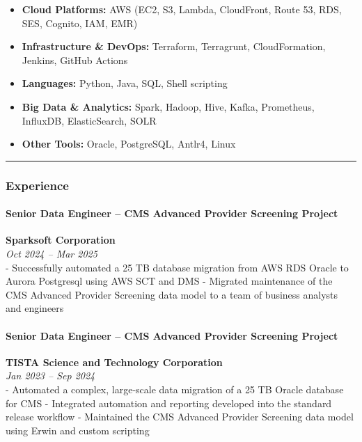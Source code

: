 \documentclass[11pt]{article}
\providecommand{\tightlist}{%
  \setlength{\itemsep}{0pt}\setlength{\parskip}{0pt}}
\begin{document}
\begin{itemize}
\tightlist
\item
  \textbf{Cloud Platforms:} AWS (EC2, S3, Lambda, CloudFront, Route 53,
  RDS, SES, Cognito, IAM, EMR)
\item
  \textbf{Infrastructure \& DevOps:} Terraform, Terragrunt,
  CloudFormation, Jenkins, GitHub Actions
\item
  \textbf{Languages:} Python, Java, SQL, Shell scripting
\item
  \textbf{Big Data \& Analytics:} Spark, Hadoop, Hive, Kafka,
  Prometheus, InfluxDB, ElasticSearch, SOLR
\item
  \textbf{Other Tools:} Oracle, PostgreSQL, Antlr4, Linux
\end{itemize}

\begin{center}\rule{0.5\linewidth}{0.5pt}\end{center}

\hypertarget{experience}{%
\subsubsection{Experience}\label{experience}}

\hypertarget{senior-data-engineer-cms-advanced-provider-screening-project}{%
\paragraph{Senior Data Engineer -- CMS Advanced Provider Screening
Project}\label{senior-data-engineer-cms-advanced-provider-screening-project}}

\textbf{Sparksoft Corporation}\\
\emph{Oct 2024 -- Mar 2025}\\
- Successfully automated a 25 TB database migration from AWS RDS Oracle
to Aurora Postgresql using AWS SCT and DMS - Migrated maintenance of the
CMS Advanced Provider Screening data model to a team of business
analysts and engineers

\hypertarget{senior-data-engineer-cms-advanced-provider-screening-project-1}{%
\paragraph{Senior Data Engineer -- CMS Advanced Provider Screening
Project}\label{senior-data-engineer-cms-advanced-provider-screening-project-1}}

\textbf{TISTA Science and Technology Corporation}\\
\emph{Jan 2023 -- Sep 2024}\\
- Automated a complex, large-scale data migration of a 25 TB Oracle
database for CMS - Integrated automation and reporting developed into
the standard release workflow - Maintained the CMS Advanced Provider
Screening data model using Erwin and custom scripting
\end{document}

